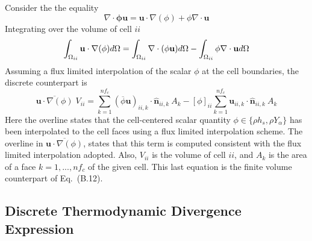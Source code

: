 Consider the the equality
%
\begin{equation}
    \nabla \cdot \mathbf{\phi u} = \mathbf{u} \cdot \nabla (\phi) + \phi \nabla \cdot \mathbf{u} \label{eq:advforms}
\end{equation}
%
Integrating over the volume of cell $ii$
%
\begin{equation}
    \int_{\Omega_{ii}} {\mathbf{u} \cdot \nabla(\phi)} d\Omega =
    \int_{\Omega_{ii}} \nabla \cdot ({\phi} \mathbf{u}) d\Omega -
    \int_{\Omega_{ii}} \phi \nabla \cdot \mathbf{u} d\Omega \label{eq:flxlim1} \\
\end{equation}
Assuming a flux limited interpolation of the scalar $\phi$ at the cell boundaries, the discrete counterpart is
%
\begin{equation}
    \overline{\mathbf{u} \cdot \nabla(\phi)} \; V_{ii} =
    \sum_{k=1}^{nf_c} (\overline{\phi} \mathbf{u})_{ii,k} \cdot \hat{\mathbf{n}}_{ii,k} \: A_k -
    [\phi]_{ii} \sum_{k=1}^{nf_c} \mathbf{u}_{ii,k} \cdot \hat{\mathbf{n}}_{ii,k} \: A_k \label{eq:flxlim2}
\end{equation}
%
Here the overline states that the cell-centered scalar quantity $\phi \in \{\rho h_s, \rho Y_\alpha\}$ has been interpolated to the cell faces using a flux limited interpolation scheme. The overline in $\overline{\mathbf{u} \cdot \nabla(\phi)}$, states that this term is computed consistent with the flux limited interpolation adopted. Also, $V_{ii}$ is the volume of cell $ii$, and $A_k$ is the area of a face $k=1,...,nf_c$ of the given cell. This last equation is the finite volume counterpart of Eq.~(B.12).

\subsection{Discrete Thermodynamic Divergence Expression}

